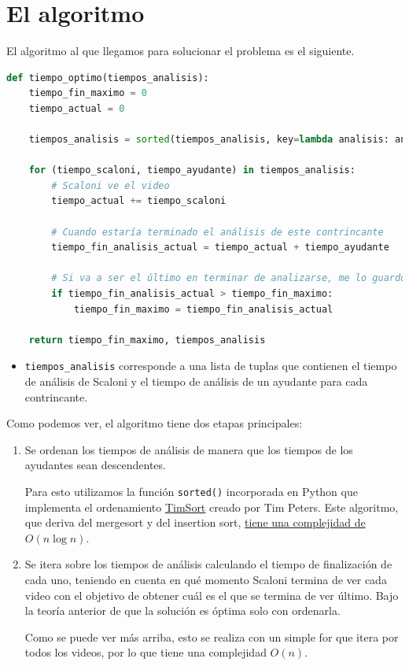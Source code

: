 \documentclass{estilo}
\begin{document}
\section{El algoritmo}

El algoritmo al que llegamos para solucionar el problema es el siguiente.

\begin{lstlisting}[language=Python]
def tiempo_optimo(tiempos_analisis):
    tiempo_fin_maximo = 0
    tiempo_actual = 0

    tiempos_analisis = sorted(tiempos_analisis, key=lambda analisis: analisis[1], reverse=True)

    for (tiempo_scaloni, tiempo_ayudante) in tiempos_analisis:
        # Scaloni ve el video
        tiempo_actual += tiempo_scaloni

        # Cuando estaría terminado el análisis de este contrincante
        tiempo_fin_analisis_actual = tiempo_actual + tiempo_ayudante

        # Si va a ser el último en terminar de analizarse, me lo guardo
        if tiempo_fin_analisis_actual > tiempo_fin_maximo:
            tiempo_fin_maximo = tiempo_fin_analisis_actual 

    return tiempo_fin_maximo, tiempos_analisis
\end{lstlisting}
\begin{itemize}
\item \texttt{tiempos\_analisis} corresponde a una lista de tuplas que contienen el tiempo de análisis de Scaloni y el tiempo de análisis de un ayudante para cada contrincante.
\end{itemize}

Como podemos ver, el algoritmo tiene dos etapas principales:
\begin{enumerate}
\item Se ordenan los tiempos de análisis de manera que los tiempos de los ayudantes sean descendentes.
    
    Para esto utilizamos la función \texttt{sorted()} incorporada en Python que implementa el ordenamiento \href{https://en.wikipedia.org/wiki/Timsort}{TimSort} creado por Tim Peters. Este algoritmo, que deriva del mergesort y del insertion sort, \href{https://drops.dagstuhl.de/opus/volltexte/2018/9467/pdf/LIPIcs-ESA-2018-4.pdf}{tiene una complejidad de} $O(n \log n)$.
\item Se itera sobre los tiempos de análisis calculando el tiempo de finalización de cada uno, teniendo en cuenta en qué momento Scaloni termina de ver cada video con el objetivo de obtener cuál es el que se termina de ver último. Bajo la teoría anterior de que la solución es óptima solo con ordenarla.
    
    Como se puede ver más arriba, esto se realiza con un simple for que itera por todos los videos, por lo que tiene una complejidad $O(n)$.
\end{enumerate}
\end{document}
